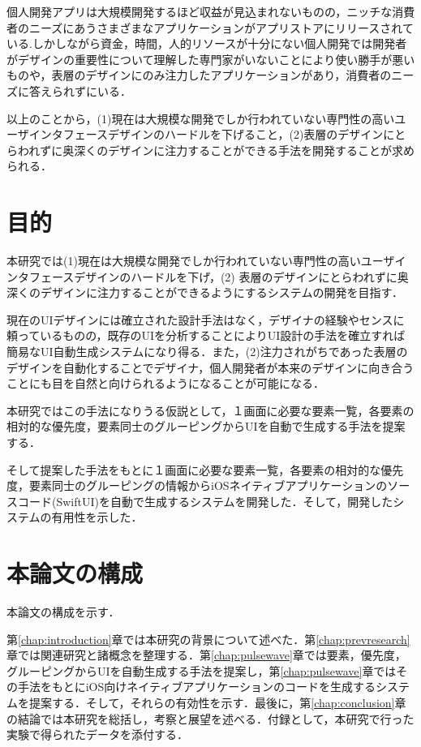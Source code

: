 個人開発アプリは大規模開発するほど収益が見込まれないものの，ニッチな消費者のニーズにあうさまざまなアプリケーションがアプリストアにリリースされている.しかしながら資金，時間，人的リソースが十分にない個人開発では開発者がデザインの重要性について理解した専門家がいないことにより使い勝手が悪いものや，表層のデザインにのみ注力したアプリケーションがあり，消費者のニーズに答えられずにいる．



以上のことから，(1)現在は大規模な開発でしか行われていない専門性の高いユーザインタフェースデザインのハードルを下げること，(2)表層のデザインにとらわれずに奥深くのデザインに注力することができる手法を開発することが求められる．

\section{目的}
本研究では(1)現在は大規模な開発でしか行われていない専門性の高いユーザインタフェースデザインのハードルを下げ，(2) 表層のデザインにとらわれずに奥深くのデザインに注力することができるようにするシステムの開発を目指す．


現在のUIデザインには確立された設計手法はなく，デザイナの経験やセンスに頼っているものの，既存のUIを分析することによりUI設計の手法を確立すれば簡易なUI自動生成システムになり得る．また，(2)注力されがちであった表層のデザインを自動化することでデザイナ，個人開発者が本来のデザインに向き合うことにも目を自然と向けられるようになることが可能になる．

本研究ではこの手法になりうる仮説として，１画面に必要な要素一覧，各要素の相対的な優先度，要素同士のグルーピングからUIを自動で生成する手法を提案する．%

そして提案した手法をもとに１画面に必要な要素一覧，各要素の相対的な優先度，要素同士のグルーピングの情報からiOSネイティブアプリケーションのソースコード(SwiftUI)を自動で生成するシステムを開発した．そして，開発したシステムの有用性を示した．

\section{本論文の構成}

本論文の構成を示す．

第\ref{chap:introduction}章では本研究の背景について述べた．第\ref{chap:prevresearch}章では関連研究と諸概念を整理する．第\ref{chap:pulsewave}章では要素，優先度，グルーピングからUIを自動生成する手法を提案し，第\ref{chap:pulsewave}章ではその手法をもとにiOS向けネイティブアプリケーションのコードを生成するシステムを提案する．そして，それらの有効性を示す．最後に，第\ref{chap:conclusion}章の結論では本研究を総括し，考察と展望を述べる．付録として，本研究で行った実験で得られたデータを添付する．
